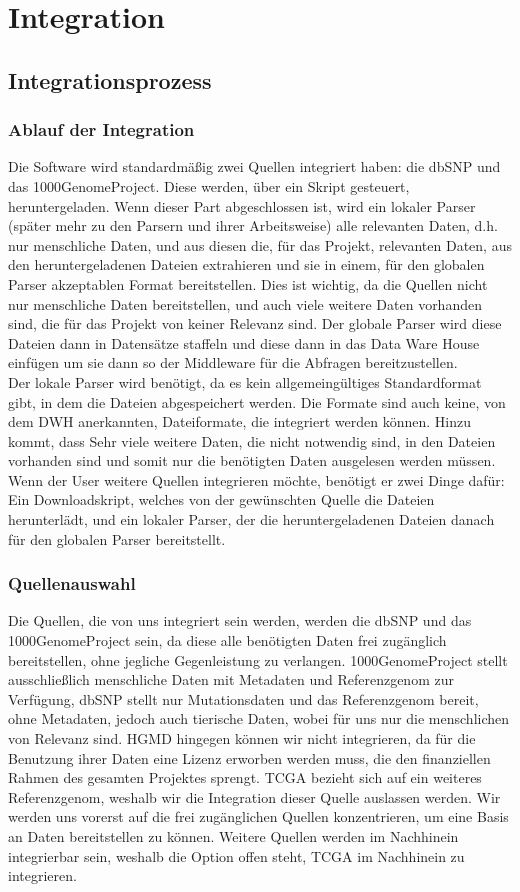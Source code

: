 \section{Integration}
\subsection{Integrationsprozess}
\subsubsection{Ablauf der Integration}
Die Software wird standardmäßig zwei Quellen integriert haben: die dbSNP und das 1000GenomeProject. Diese werden, über ein Skript gesteuert, heruntergeladen. Wenn dieser Part abgeschlossen ist, wird ein lokaler Parser (später mehr zu den Parsern und ihrer Arbeitsweise) alle relevanten Daten, d.h. nur menschliche Daten, und aus diesen die, für das Projekt, relevanten Daten, aus den heruntergeladenen Dateien extrahieren und sie in einem, für den globalen Parser akzeptablen Format bereitstellen. Dies ist wichtig, da die Quellen nicht nur menschliche Daten bereitstellen, und auch viele weitere Daten vorhanden sind, die für das Projekt von keiner Relevanz sind. Der globale Parser wird diese Dateien dann in Datensätze staffeln und diese dann in das Data Ware House einfügen um sie dann so der Middleware für die Abfragen bereitzustellen.\\
Der lokale Parser wird benötigt, da es kein allgemeingültiges Standardformat gibt, in dem die Dateien abgespeichert werden. Die Formate sind auch keine, von dem DWH anerkannten, Dateiformate, die integriert werden können. Hinzu kommt, dass Sehr viele weitere Daten, die nicht notwendig sind, in den Dateien vorhanden sind und somit nur die benötigten Daten ausgelesen werden müssen.\\
Wenn der User weitere Quellen integrieren möchte, benötigt er zwei Dinge dafür: Ein Downloadskript, welches von der gewünschten Quelle die Dateien herunterlädt, und ein lokaler Parser, der die heruntergeladenen Dateien danach für den globalen Parser bereitstellt.
\subsubsection{Quellenauswahl}
Die Quellen, die von uns integriert sein werden, werden die dbSNP und das 1000GenomeProject sein, da diese alle benötigten Daten frei zugänglich bereitstellen, ohne jegliche Gegenleistung zu verlangen. 1000GenomeProject stellt ausschließlich menschliche Daten mit Metadaten und Referenzgenom zur Verfügung, dbSNP stellt nur Mutationsdaten und das Referenzgenom bereit, ohne Metadaten, jedoch auch tierische Daten, wobei für uns nur die menschlichen von Relevanz sind. HGMD hingegen können wir nicht integrieren, da für die Benutzung ihrer Daten eine Lizenz erworben werden muss, die den finanziellen Rahmen des gesamten Projektes sprengt. TCGA bezieht sich auf ein weiteres Referenzgenom, weshalb wir die Integration dieser Quelle auslassen werden. Wir werden uns vorerst auf die frei zugänglichen Quellen konzentrieren, um eine Basis an Daten bereitstellen zu können. Weitere Quellen werden im Nachhinein integrierbar sein, weshalb die Option offen steht, TCGA im Nachhinein zu integrieren.
